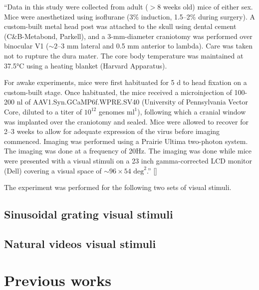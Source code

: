 \documentclass[MTech]{iitmdiss}
\begin{document}
``Data in this study were collected from adult ($> 8$ weeks old) mice of either sex. Mice were anesthetized using isoflurane (3\% induction, 1.5–2\% during surgery). A custom-built metal head post was attached to the skull using dental cement (C\&B-Metabond, Parkell), and a 3-mm-diameter craniotomy was performed over binocular V1 ($\sim 2–3$ mm lateral and 0.5 mm anterior to lambda). Care was taken not to rupture the dura mater. The core body temperature was maintained at 37.5°C using a heating blanket (Harvard Apparatus).

For awake experiments, mice were first habituated for 5 d to head fixation on a custom-built stage. Once habituated, the mice received a microinjection of 100-200 nl of AAV1.Syn.GCaMP6f.WPRE.SV40 (University of Pennsylvania Vector Core, diluted to a titer of $10^{12}$ genomes $\text{ml}^1$), following which a cranial window was implanted over the
craniotomy and sealed. Mice were allowed to recover for 2–3 weeks to allow for adequate expression of the virus before imaging commenced. Imaging was performed using a Prairie Ultima two-photon system. The imaging was done at a frequency of 20Hz. The imaging was done while mice were presented with a visual stimuli on a 23 inch gamma-corrected LCD monitor (Dell) covering a visual space of $\sim 96 \times 54 \text{ deg}^2$.'' [\cite{rikhye2015spatial}]

The experiment was performed for the following two sets of visual stimuli.
\subsection{Sinusoidal grating visual stimuli} %
\label{sub:sinusoidal_grating_visual_stimuli}


\subsection{Natural videos visual stimuli} %
\label{sub:natural_videos_visual_stimuli}

\section{Previous works} %
\label{sec:previous_work}

\end{document}
